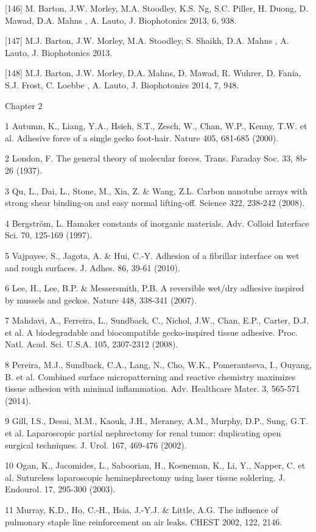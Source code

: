 [146]	M. Barton, J.W. Morley, M.A. Stoodley, K.S. Ng, S.C. Piller, H. Duong, D. Mawad, D.A. Mahns , A. Lauto, J. Biophotonics 2013, 6, 938.

[147]	M.J. Barton, J.W. Morley, M.A. Stoodley, S. Shaikh, D.A. Mahns , A. Lauto, J. Biophotonics 2013.

[148]	M.J. Barton, J.W. Morley, D.A. Mahns, D. Mawad, R. Wuhrer, D. Fania, S.J. Frost, C. Loebbe , A. Lauto, J. Biophotonics 2014, 7, 948.

\large{Chapter 2}

1	Autumn, K., Liang, Y.A., Hsieh, S.T., Zesch, W., Chan, W.P., Kenny, T.W. et al. Adhesive force of a single gecko foot-hair. Nature 405, 681-685 (2000).

2	London, F. The general theory of molecular forces. Trans. Faraday Soc. 33, 8b-26 (1937).

3	Qu, L., Dai, L., Stone, M., Xia, Z. \& Wang, Z.L. Carbon nanotube arrays with strong shear binding-on and easy normal lifting-off. Science 322, 238-242 (2008).

4	Bergström, L. Hamaker constants of inorganic materials. Adv. Colloid Interface Sci. 70, 125-169 (1997). 

5	Vajpayee, S., Jagota, A. \& Hui, C.-Y. Adhesion of a fibrillar interface on wet and rough surfaces. J. Adhes. 86, 39-61 (2010). 

6	Lee, H., Lee, B.P. \& Messersmith, P.B. A reversible wet/dry adhesive inspired by mussels and geckos. Nature 448, 338-341 (2007).

7	Mahdavi, A., Ferreira, L., Sundback, C., Nichol, J.W., Chan, E.P., Carter, D.J. et al. A biodegradable and biocompatible gecko-inspired tissue adhesive. Proc. Natl. Acad. Sci. U.S.A. 105, 2307-2312 (2008).

8	Pereira, M.J., Sundback, C.A., Lang, N., Cho, W.K., Pomerantseva, I., Ouyang, B. et al. Combined surface micropatterning and reactive chemistry maximizes tissue adhesion with minimal inflammation. Adv. Healthcare Mater. 3, 565-571 (2014).

9	Gill, I.S., Desai, M.M., Kaouk, J.H., Meraney, A.M., Murphy, D.P., Sung, G.T. et al. Laparoscopic partial nephrectomy for renal tumor: duplicating open surgical techniques. J. Urol. 167, 469-476 (2002).

10	Ogan, K., Jacomides, L., Saboorian, H., Koeneman, K., Li, Y., Napper, C. et al. Sutureless laparoscopic heminephrectomy using laser tissue soldering. J. Endourol. 17, 295-300 (2003). 

11	Murray, K.D., Ho, C.-H., Hsia, J.-Y.J. \& Little, A.G. The influence of pulmonary staple line reinforcement on air leaks. CHEST 2002, 122, 2146.

